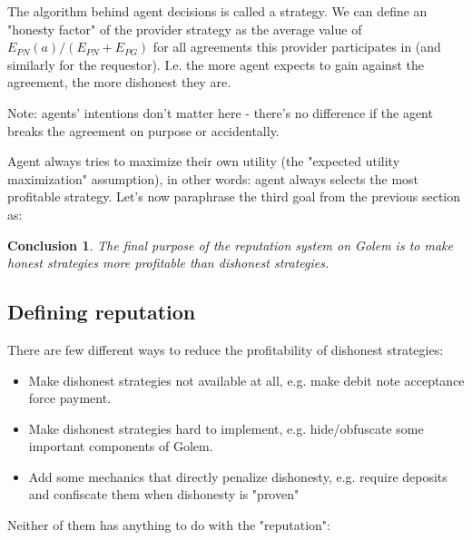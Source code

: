 \documentclass{article}
\newtheorem{conclusion}{Conclusion}[section]
\begin{document}
The algorithm behind agent decisions is called a strategy. We can define an "honesty factor" of the provider strategy as 
the average value of $E_{PN}(a)/(E_{PN} + E_{PG})$ for all agreements this provider participates in (and similarly for the requestor).
I.e. the more agent expects to gain against the agreement, the more dishonest they are.

Note: agents' intentions don't matter here - there's no difference if the agent breaks the agreement on purpose or accidentally.

Agent always tries to maximize their own utility (the "expected utility maximization" assumption), in other words: agent always selects the most profitable strategy.
Let's now paraphrase the third goal from the previous section as:

\begin{conclusion}

The final purpose of the reputation system on Golem is to make honest strategies more profitable than dishonest strategies.

\label{main purpose conclusion}
\end{conclusion}


\subsection{Defining reputation}

There are few different ways to reduce the profitability of dishonest strategies:

\begin{itemize}
\item{Make dishonest strategies not available at all, e.g. make debit note acceptance force payment.}
\item{Make dishonest strategies hard to implement, e.g. hide/obfuscate some important components of Golem.}
\item{Add some mechanics that directly penalize dishonesty, e.g. require deposits and confiscate them when dishonesty is "proven"}
\end{itemize}

Neither of them has anything to do with the "reputation":
\end{document}
